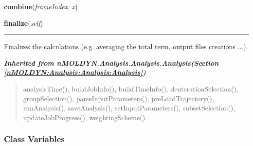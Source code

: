     \vspace{0.5ex}

\hspace{.8\funcindent}\begin{boxedminipage}{\funcwidth}

    \raggedright \textbf{combine}(\textit{frameIndex}, \textit{x})

\setlength{\parskip}{2ex}
\setlength{\parskip}{1ex}
    \end{boxedminipage}

    \label{nMOLDYN:Analysis:Dynamics:CenterOfMassTrajectory:finalize}

    \vspace{0.5ex}

\hspace{.8\funcindent}\begin{boxedminipage}{\funcwidth}

    \raggedright \textbf{finalize}(\textit{self})

    \vspace{-1.5ex}

    \rule{\textwidth}{0.5\fboxrule}
\setlength{\parskip}{2ex}
    Finalizes the calculations (e.g. averaging the total term, output files
    creations ...).

\setlength{\parskip}{1ex}
    \end{boxedminipage}


\large{\textbf{\textit{Inherited from nMOLDYN.Analysis.Analysis.Analysis\textit{(Section \ref{nMOLDYN:Analysis:Analysis:Analysis})}}}}

\begin{quote}
analysisTime(), buildJobInfo(), buildTimeInfo(), deuterationSelection(), groupSelection(), parseInputParameters(), preLoadTrajectory(), runAnalysis(), saveAnalysis(), setInputParameters(), subsetSelection(), updateJobProgress(), weightingScheme()
\end{quote}


  \subsubsection{Class Variables}

